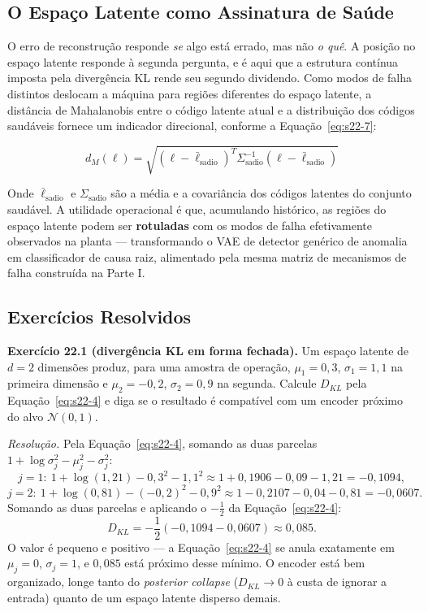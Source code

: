 \documentclass[12pt,a4paper]{article}
\numberwithin{equation}{section}
\numberwithin{table}{section}
\numberwithin{figure}{section}
\begin{document}
	\subsection{O Espaço Latente como Assinatura de Saúde}

	O erro de reconstrução responde \textit{se} algo está errado, mas não \textit{o quê}. A posição no espaço latente responde à segunda pergunta, e é aqui que a estrutura contínua imposta pela divergência KL rende seu segundo dividendo. Como modos de falha distintos deslocam a máquina para regiões diferentes do espaço latente, a distância de Mahalanobis entre o código latente atual e a distribuição dos códigos saudáveis fornece um indicador direcional, conforme a Equação~\eqref{eq:s22-7}:

	\begin{equation}\label{eq:s22-7}
	d_M(\ell) = \sqrt{ (\ell - \bar{\ell}_{\text{sadio}})^T \Sigma_{\text{sadio}}^{-1} (\ell - \bar{\ell}_{\text{sadio}}) }
\end{equation}

	Onde $\bar{\ell}_{\text{sadio}}$ e $\Sigma_{\text{sadio}}$ são a média e a covariância dos códigos latentes do conjunto saudável. A utilidade operacional é que, acumulando histórico, as regiões do espaço latente podem ser \textbf{rotuladas} com os modos de falha efetivamente observados na planta — transformando o VAE de detector genérico de anomalia em classificador de causa raiz, alimentado pela mesma matriz de mecanismos de falha construída na Parte I.

	\subsection{Exercícios Resolvidos}

	\textbf{Exercício 22.1 (divergência KL em forma fechada).} Um espaço
	latente de $d=2$ dimensões produz, para uma amostra de operação,
	$\mu_1=0{,}3$, $\sigma_1=1{,}1$ na primeira dimensão e $\mu_2=-0{,}2$,
	$\sigma_2=0{,}9$ na segunda. Calcule $D_{KL}$ pela
	Equação~\eqref{eq:s22-4} e diga se o resultado é compatível com um
	encoder próximo do alvo $\mathcal{N}(0,1)$.

	\emph{Resolução.} Pela Equação~\eqref{eq:s22-4}, somando as duas
	parcelas $1+\log\sigma_j^2-\mu_j^2-\sigma_j^2$:
	$$j=1:\ 1+\log(1{,}21)-0{,}3^2-1{,}1^2 \approx 1+0{,}1906-0{,}09-1{,}21
	= -0{,}1094,$$
	$$j=2:\ 1+\log(0{,}81)-(-0{,}2)^2-0{,}9^2 \approx
	1-0{,}2107-0{,}04-0{,}81 = -0{,}0607.$$
	Somando as duas parcelas e aplicando o $-\frac{1}{2}$ da
	Equação~\eqref{eq:s22-4}:
	$$D_{KL} = -\frac{1}{2}(-0{,}1094-0{,}0607) \approx 0{,}085.$$
	O valor é pequeno e positivo --- a Equação~\eqref{eq:s22-4} se anula
	exatamente em $\mu_j=0$, $\sigma_j=1$, e $0{,}085$ está próximo desse
	mínimo. O encoder está bem organizado, longe tanto do
	\textit{posterior collapse} ($D_{KL}\to 0$ à custa de ignorar a
	entrada) quanto de um espaço latente disperso demais.
\end{document}
